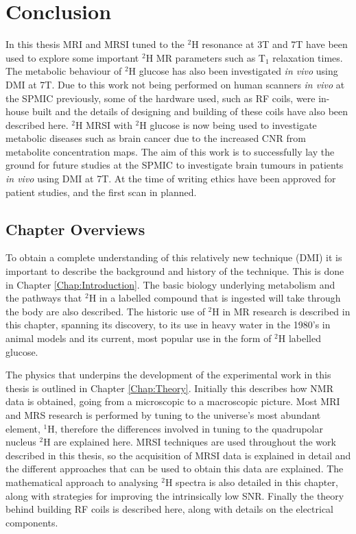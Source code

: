 \chapter{Conclusion}
\label{section:Conclusion}

In this thesis \ac{MRI} and \ac{MRSI} tuned to the $^2$H resonance at 3T and 7T have been used to explore some important $^2$H MR parameters such as T$_1$ relaxation times. The metabolic behaviour of $^2$H glucose has also been investigated \textit{in vivo} using \ac{DMI} at 7T. Due to this work not being performed on human scanners \textit{in vivo} at the \ac{SPMIC} previously, some of the hardware used, such as \ac{RF} coils, were in-house built and the details of designing and building of these coils have also been described here. $^2$H MRSI with $^2$H glucose is now being used to investigate metabolic diseases such as brain cancer due to the increased \ac{CNR} from metabolite concentration maps. The aim of this work is to successfully lay the ground for future studies at the SPMIC to investigate brain tumours in patients \textit{in vivo} using \ac{DMI} at 7T. At the time of writing ethics have been approved for patient studies, and the first scan in planned. 

\section{Chapter Overviews}

To obtain a complete understanding of this relatively new technique (\ac{DMI}) it is important to describe the background and history of the technique. This is done in Chapter \ref{Chap:Introduction}. The basic biology underlying metabolism and the pathways that $^2$H in a labelled compound that is ingested will take through the body are also described. The historic use of $^2$H in MR research is described in this chapter, spanning its discovery, to its use in heavy water in the 1980's in animal models and its current, most popular use in the form of $^2$H labelled glucose.

The physics that underpins the development of the experimental work in this thesis is outlined in Chapter \ref{Chap:Theory}. Initially this describes how \ac{NMR} data is obtained, going from a microscopic to a macroscopic picture. Most \ac{MRI} and \ac{MRS} research is performed by tuning to the universe's most abundant element, $^1$H, therefore the differences involved in tuning to the quadrupolar nucleus $^2$H are explained here. \Ac{MRSI} techniques are used throughout the work described in this thesis, so the acquisition of \ac{MRSI} data is explained in detail and the different approaches that can be used to obtain this data are explained. The mathematical approach to analysing $^2$H spectra is also detailed in this chapter, along with strategies for improving the intrinsically low \ac{SNR}. Finally the theory behind building \ac{RF} coils is described here, along with details on the electrical components.

